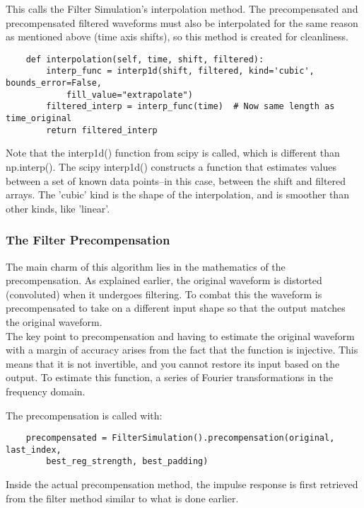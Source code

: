 This calls the Filter Simulation's interpolation method. The precompensated and precompensated filtered waveforms must also be interpolated for the same reason as mentioned above (time axis shifts), so this method is created for cleanliness. 

\begin{verbatim}
    def interpolation(self, time, shift, filtered):
        interp_func = interp1d(shift, filtered, kind='cubic', bounds_error=False, 
            fill_value="extrapolate")
        filtered_interp = interp_func(time)  # Now same length as time_original
        return filtered_interp
\end{verbatim}

Note that the interp1d() function from scipy is called, which is different than np.interp(). The scipy interp1d() constructs a function that estimates values between a set of known data points--in this case, between the shift and filtered arrays. The 'cubic' kind is the shape of the interpolation, and is smoother than other kinds, like 'linear'.

\subsubsection{The Filter Precompensation}

The main charm of this algorithm lies in the mathematics of the precompensation. As explained earlier, the original waveform is distorted (convoluted) when it undergoes filtering. To combat this the waveform is precompensated to take on a different input shape so that the output matches the original waveform. 
\\
The key point to precompensation and having to estimate the original waveform with a margin of accuracy arises from the fact that the function is injective. This means that it is not invertible, and you cannot restore its input based on the output. To estimate this function, a series of Fourier transformations in the frequency domain. 

The precompensation is called with:

\begin{verbatim}
    precompensated = FilterSimulation().precompensation(original, last_index, 
        best_reg_strength, best_padding)
\end{verbatim}

Inside the actual precompensation method, the impulse response is first retrieved from the filter method similar to what is done earlier.

